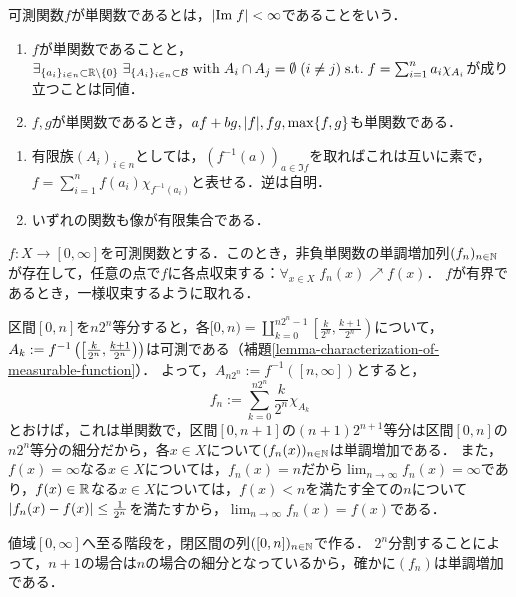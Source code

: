 \documentclass[uplatex, dvipdfmx]{jsreport}
\begin{document}
\begin{definition}
    可測関数$f$が単関数であるとは，$\lvert\mathrm{Im}\; f\rvert<\infty$であることをいう．
\end{definition}

\begin{lemma}\mbox{}
    \begin{enumerate}
        \item $f$が単関数であることと，$\exists_{\{a_i\}_{i\in n}\subset\mathbb{R}\setminus\{0\}}\;\exists_{\{A_i\}_{i\in n}\subset\mathcal{B}}\;\mathrm{with}\;A_i\cap A_j=\emptyset\;(i\ne j)\;\mathrm{s.t.}\; f=\sum_{i=1}^na_i\chi_{A_i}$が成り立つことは同値．
        \item $f,g$が単関数であるとき，$af+bg,\lvert f\rvert,fg,\max\{f,g\}$も単関数である．
    \end{enumerate}
\end{lemma}
\begin{Proof}\mbox{}
    \begin{enumerate}
        \item 有限族$(A_i)_{i\in n}$としては，$(f^{-1}(a))_{a\in\Im f}$を取ればこれは互いに素で，$f=\sum^n_{i=1}f(a_i)\chi_{f^{-1}(a_i)}$と表せる．逆は自明．
        \item いずれの関数も像が有限集合である．
    \end{enumerate}
\end{Proof}

\begin{theorem}[単関数近似]\label{thm-simple-function-approximation}
    $f:X\to[0,\infty]$を可測関数とする．このとき，非負単関数の単調増加列$(f_n)_{n\in\mathbb{N}}$が存在して，任意の点で$f$に各点収束する：$\forall_{x\in X}\;f_n(x)\nearrow f(x)$．
    $f$が有界であるとき，一様収束するように取れる．
\end{theorem}
\begin{Proof}
    区間$[0,n]$を$n2^n$等分すると，各$[0,n)=\coprod_{k=0}^{n2^n-1}\left[\frac{k}{2^n},\frac{k+1}{2^n}\right)$について，$A_k:=f^{-1}\left(\left[\frac{k}{2^n},\frac{k+1}{2^n}\right)\right)$は可測である（補題\ref{lemma-characterization-of-measurable-function}）．
    よって，$A_{n2^n}:=f^{-1}([n,\infty])$とすると，
    \[f_n:=\sum^{n2^n}_{k=0}\frac{k}{2^n}\chi_{A_k}\]
    とおけば，これは単関数で，区間$[0,n+1]$の$(n+1)2^{n+1}$等分は区間$[0,n]$の$n2^n$等分の細分だから，各$x\in X$について$(f_n(x))_{n\in\mathbb{N}}$は単調増加である．
    また，$f(x)=\infty$なる$x\in X$については，$f_n(x)=n$だから$\lim_{n\to\infty}f_n(x)=\infty$であり，$f(x)\in\mathbb{R}$なる$x\in X$については，$f(x)<n$を満たす全ての$n$について$\lvert f_n(x)-f(x)\rvert\le\frac{1}{2^n}$を満たすから，$\lim_{n\to\infty}f_n(x)=f(x)$である．
\end{Proof}
\begin{remarks}
    値域$[0,\infty]$へ至る階段を，閉区間の列$([0,n])_{n\in\mathbb{N}}$で作る．
    $2^n$分割することによって，$n+1$の場合は$n$の場合の細分となっているから，確かに$(f_n)$は単調増加である．
\end{remarks}
\end{document}
